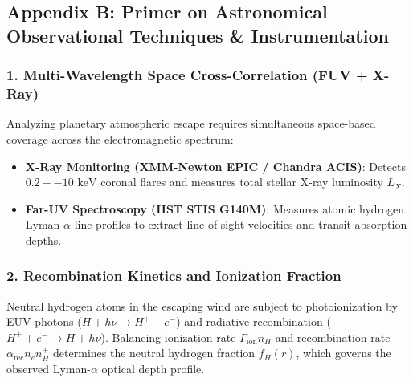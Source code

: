 \documentclass[11pt,a4paper]{article}
\begin{document}
\subsection*{Appendix B: Primer on Astronomical Observational Techniques \& Instrumentation}

\subsubsection*{1. Multi-Wavelength Space Cross-Correlation (FUV + X-Ray)}
Analyzing planetary atmospheric escape requires simultaneous space-based coverage across the electromagnetic spectrum:
\begin{itemize}
    \item \textbf{X-Ray Monitoring (XMM-Newton EPIC / Chandra ACIS)}: Detects $0.2--10\text{ keV}$ coronal flares and measures total stellar X-ray luminosity $L_X$.
    \item \textbf{Far-UV Spectroscopy (HST STIS G140M)}: Measures atomic hydrogen Lyman-$\alpha$ line profiles to extract line-of-sight velocities and transit absorption depths.
\end{itemize}

\subsubsection*{2. Recombination Kinetics and Ionization Fraction}
Neutral hydrogen atoms in the escaping wind are subject to photoionization by EUV photons ($H + h\nu \to H^+ + e^-$) and radiative recombination ($H^+ + e^- \to H + h\nu$). Balancing ionization rate $\Gamma_{\text{ion}} n_H$ and recombination rate $\alpha_{\text{rec}} n_e n_H^+$ determines the neutral hydrogen fraction $f_H(r)$, which governs the observed Lyman-$\alpha$ optical depth profile.
\end{document}
